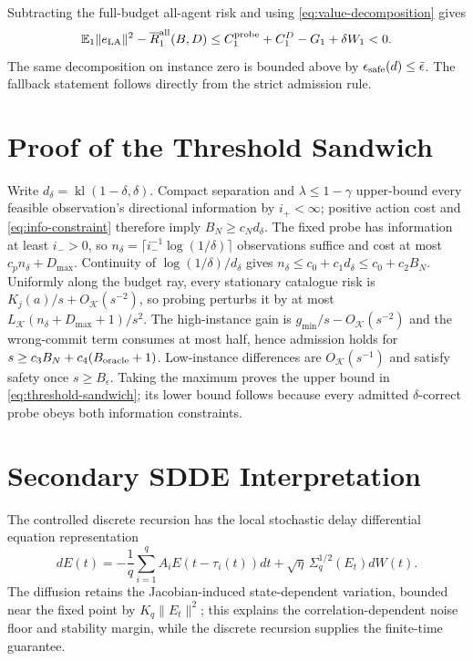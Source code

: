 Subtracting the full-budget all-agent risk and using \eqref{eq:value-decomposition} gives
\begin{equation}
\mathbb{E}_1\|e_{\rm LA}\|^2-\overline R_1^{\rm all}(B,D)
\le C_1^{\rm probe}+C_1^D-G_1+\delta W_1<0.
\end{equation}
The same decomposition on instance zero is bounded above by $\epsilon_{\rm safe}(d)\le\bar\epsilon$.
The fallback statement follows directly from the strict admission rule.

\section{Proof of the Threshold Sandwich}
Write $d_\delta=\operatorname{kl}(1-\delta,\delta)$.
Compact separation and $\lambda\le1-\gamma$ upper-bound every feasible observation's directional information by $i_+<\infty$; positive action cost and \eqref{eq:info-constraint} therefore imply $B_N\ge c_Nd_\delta$.
The fixed probe has information at least $i_->0$, so $n_\delta=\lceil i_-^{-1}\log(1/\delta)\rceil$ observations suffice and cost at most $c_pn_\delta+D_{\max}$.
Continuity of $\log(1/\delta)/d_\delta$ gives $n_\delta\le c_0+c_1d_\delta\le c_0+c_2B_N$.
Uniformly along the budget ray, every stationary catalogue risk is $K_j(a)/s+O_{\mathcal K}(s^{-2})$, so probing perturbs it by at most $L_{\mathcal K}(n_\delta+D_{\max}+1)/s^2$.
The high-instance gain is $g_{\min}/s-O_{\mathcal K}(s^{-2})$ and the wrong-commit term consumes at most half, hence admission holds for $s\ge c_3B_N+c_4(B_{\rm oracle}+1)$.
Low-instance differences are $O_{\mathcal K}(s^{-1})$ and satisfy safety once $s\ge B_\epsilon$.
Taking the maximum proves the upper bound in \eqref{eq:threshold-sandwich}; its lower bound follows because every admitted $\delta$-correct probe obeys both information constraints.

\section{Secondary SDDE Interpretation}
The controlled discrete recursion has the local stochastic delay differential equation representation
\begin{equation}
dE(t)=-\frac1q\sum_{i=1}^{q}A_iE(t-\tau_i(t))dt+\sqrt{\eta}\,\Sigma_q^{1/2}(E_t)dW(t).
\end{equation}
The diffusion retains the Jacobian-induced state-dependent variation, bounded near the fixed point by $K_q\|E_t\|^2$; this explains the correlation-dependent noise floor and stability margin, while the discrete recursion supplies the finite-time guarantee.
